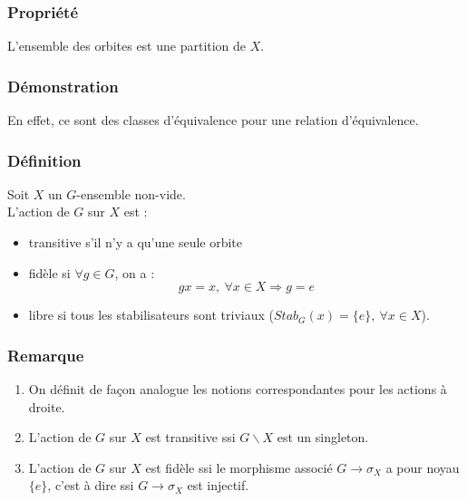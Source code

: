 \documentclass[a4paper, oneside]{report}
\newcommand{\defi}{\subsubsection{Définition}}
\newcommand{\dem}{\subsubsection{Démonstration}}
\newcommand{\propr}{\subsubsection{Propriété}}
\newcommand{\remar}{\subsubsection{Remarque}}
\begin{document}
\propr
L'ensemble des orbites est une partition de $X$.

\dem
En effet, ce sont des classes d'équivalence pour une relation d'équivalence.

\defi 
Soit $X$ un $G$-ensemble non-vide.\\
L'action de $G$ sur $X$ est :
\begin{itemize}
\item transitive s'il n'y a qu'une seule orbite
\item fidèle si $\forall g\in G$, on a :
$$gx=x,~\forall x\in X \Rightarrow g=e$$
\item libre si tous les stabilisateurs sont triviaux ($Stab_G(x)=\{e\},~\forall x\in X$).
\end{itemize}

\remar
\begin{enumerate}
\item On définit de façon analogue les notions correspondantes pour les actions à droite.
\item L'action de $G$ sur $X$ est transitive ssi $G\backslash X$ est un singleton.
\item L'action de $G$ sur $X$ est fidèle ssi le morphisme associé $G\rightarrow \sigma_X$ a pour noyau $\{e\}$, c'est à dire ssi $G\rightarrow \sigma_X$ est injectif.
\end{enumerate}
\end{document}
